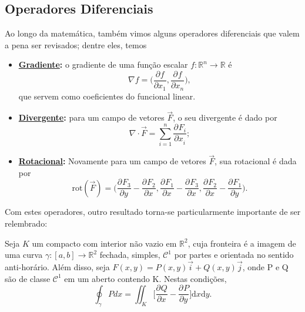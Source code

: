 \documentclass[../differential_forms.tex]{subfiles}
\begin{document}
\subsection{Operadores Diferenciais}
Ao longo da matemática, também vimos alguns operadores diferenciais que valem a pena ser revisados; dentre eles, temos
\begin{itemize}
	\item \textbf{\underline{Gradiente}:} o gradiente de uma função escalar \(f:\mathbb{R}^{n}\rightarrow \mathbb{R}\) é
	      \[
		      \nabla f = \biggl(\frac{\partial^{}f}{\partial x_1^{}}, \frac{\partial^{}f}{\partial x_{n}^{}}\biggr),
	      \]
	      que servem como coeficientes do funcional linear.
	\item \textbf{\underline{Divergente}:} para um campo de vetores \(\vec{F}\), o seu divergente é dado por
	      \[
		      \nabla \cdot \vec{F} = \sum\limits_{i=1}^{n}\frac{\partial^{}F_{i}}{\partial x_{i}^{}};
	      \]
	\item \textbf{\underline{Rotacional}:} Novamente para um campo de vetores \(\vec{F}\), sua rotacional é dada por
	      \[
		      \mathrm{rot}(\vec{F}) = \biggl(\frac{\partial^{}F_3}{\partial y^{}} - \frac{\partial^{}F_2}{\partial x^{}}, \frac{\partial^{}F_1}{\partial x^{}} - \frac{\partial^{}F_3}{\partial x^{}}, \frac{\partial^{}F_2}{\partial x^{}} - \frac{\partial^{}F_1}{\partial y^{}}\biggr).
	      \]
\end{itemize}
Com estes operadores, outro resultado torna-se particularmente importante de ser relembrado:
\hypertarget{green_theorem_calc}{
	\begin{theorem*}
		Seja \(K\) um compacto com interior não vazio em \(\mathbb{R}^{2}\), cuja fronteira é a imagem de uma curva \(\gamma : [a, b]\rightarrow \mathbb{R}^{2}\) fechada, simples, \(\mathcal{C}^{1}\) por partes e orientada no sentido anti-horário. Além disso, seja \(F(x, y) = P(x, y)\vec{i} + Q(x, y)\vec{j}\), onde P e Q são de classe \(\mathcal{C}^{1}\) em um aberto contendo K. Nestas condições,
		\[
			\oint_{\gamma }Pdx = \iint_{K}\biggl[\frac{\partial^{}Q}{\partial x^{}} - \frac{\partial^{}P}{\partial y^{}}\biggr]\mathrm{d}x \mathrm{d}y.
		\]
	\end{theorem*}
}
\end{document}
